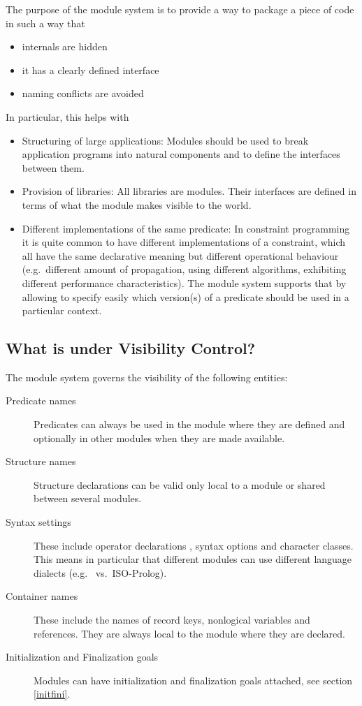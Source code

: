The purpose of the module system is to provide a way to package
a piece of code in such a way that
\begin{itemize}
\item internals are hidden
\item it has a clearly defined interface
\item naming conflicts are avoided
\end{itemize}
In particular, this helps with
\begin{itemize}
\item Structuring of large applications:
    Modules should be used to break application programs into
    natural components and to define the interfaces between them.
\item Provision of libraries:
    All {\eclipse} libraries are modules. Their interfaces are
    defined in terms of what the module makes visible to the world.
\item Different implementations of the same predicate:
    In constraint programming it is quite common to have different
    implementations of a constraint, which all have the same declarative
    meaning but different operational behaviour (e.g.\ different amount of
    propagation, using different algorithms, exhibiting different
    performance characteristics). The module system supports that by
    allowing to specify easily which version(s) of a predicate should
    be used in a particular context.
\end{itemize}


\subsection{What is under Visibility Control?}

The {\eclipse} module system governs the visibility of the following
entities:
\begin{description}
\item[Predicate names]
    Predicates can always be used in the module where they are defined
    and optionally in other modules when they are made available.
\item[Structure names]
    Structure declarations can be valid only local to a module or
    shared between several modules.
\item[Syntax settings]
    These include operator declarations
    ,
    syntax options and
    character classes.
    This means in particular that different modules can use different
    language dialects (e.g.\ {\eclipse} vs.\ ISO-Prolog).
\item[Container names]
    These include the names of record keys, nonlogical variables and references.
    They are always local to the module where they are declared.
\item[Initialization and Finalization goals]
    Modules can have initialization and finalization goals attached,
    see section \ref{initfini}.
\end{description}

